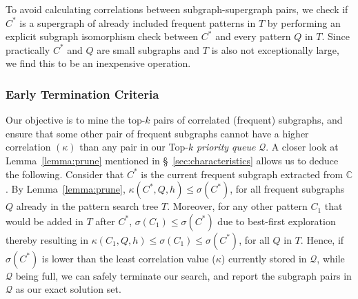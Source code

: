  To avoid calculating correlations
between subgraph-supergraph pairs, we check if $C^*$ is a supergraph of already
included frequent patterns in $T$ by performing an explicit subgraph isomorphism
check between $C^*$ and every pattern $Q$ in $T$. Since practically $C^*$ and $Q$ are
small subgraphs and $T$ is also not exceptionally large, we find this to be an
inexpensive operation.
%
\subsubsection{Early Termination Criteria}
\label{sec:early_termination}
%
Our objective is to mine the top-$k$ pairs of correlated (frequent) subgraphs,
and ensure that some other pair of frequent subgraphs cannot have a higher
correlation $(\kappa)$ than any pair in our {\sf Top-$k$} {\em priority queue}
$\mathcal{Q}$. A closer look at Lemma~\ref{lemma:prune} mentioned in
\S~\ref{sec:characteristics} allows us to deduce the following. Consider that
$C^*$ is the current frequent subgraph extracted from $\mathbb{C}$. By
Lemma~\ref{lemma:prune}, $\kappa(C^*,Q,h)\le \sigma(C^*)$, for all frequent
subgraphs $Q$ already in the pattern search tree $T$. Moreover, for any other
pattern $C_1$ that would be added in $T$ after $C^*$,
$\sigma(C_1)\le\sigma(C^*)$ due to best-first exploration thereby resulting in
$\kappa(C_1,Q,h)\le \sigma(C_1) \le \sigma(C^*)$, for all $Q$ in $T$. Hence, if
$\sigma(C^*)$ is lower than the least correlation value ($\kappa$) currently
stored in $\mathcal{Q}$, while $\mathcal{Q}$ being full, we can safely terminate
our search, and report the subgraph pairs in $\mathcal{Q}$ as our exact
solution set.

